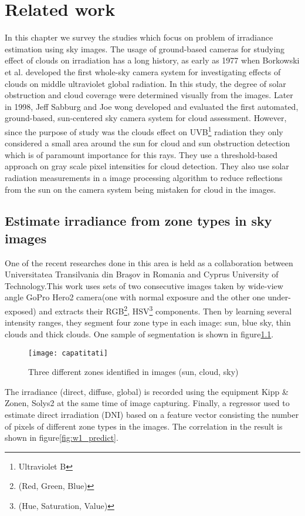 \chapter{Related work}
In this chapter we survey the studies which focus on problem of irradiance estimation using sky images. The usage of ground-based cameras for studying effect of clouds on irradiation has a long history, as early as 1977 when Borkowski et al.\cite{Borkowski1977} developed the first whole-sky camera system for investigating effects of clouds on middle ultraviolet global radiation. In this study, the degree of solar obstruction and cloud coverage were determined visually from the images. Later in 1998, Jeff Sabburg and Joe wong\cite{Sabburg1998} developed and evaluated the first automated, ground-based, sun-centered sky camera system for cloud assessment. However, since the purpose of study was the clouds effect on UVB\footnote{Ultraviolet B} radiation they only considered a small area around the sun for cloud and sun obstruction detection which is of paramount importance for this rays. They use a threshold-based approach on gray scale pixel intensities for cloud detection. They also use solar radiation measurements in a image processing algorithm to reduce reflections from the sun on the camera system being mistaken for cloud in the images.

\section{Estimate irradiance from zone types in sky images}
One of the recent researches done in this area is held as a collaboration between Universitatea Transilvania din Braşov in Romania and Cyprus University of Technology\cite{romania_paper}\cite{romania_report}.This work uses sets of two consecutive images taken by wide-view angle GoPro Hero2 camera(one with normal exposure and the other one under-exposed) and extracts their RGB\footnote{(Red, Green, Blue)}, HSV\footnote{(Hue, Saturation, Value)} components. Then by learning several intensity ranges, they segment four zone type in each image: sun, blue sky, thin clouds and thick clouds. One sample of segmentation is shown in figure\ref{fig:capatitati}.

\begin{figure}[h]
\caption{Three different zones identified in images (sun, cloud, sky)}
\label{fig:capatitati}
\texttt{[image: capatitati]}
\centering
\end{figure} 

 The irradiance (direct, diffuse, global) is recorded using the equipment Kipp \& Zonen, Solys2 at the same time of image capturing. Finally, a regressor used to estimate direct irradiation (DNI) based on a feature vector consisting the number of pixels of different zone types in the images. The correlation in the result is shown in figure\ref{fig:w1_predict}.

